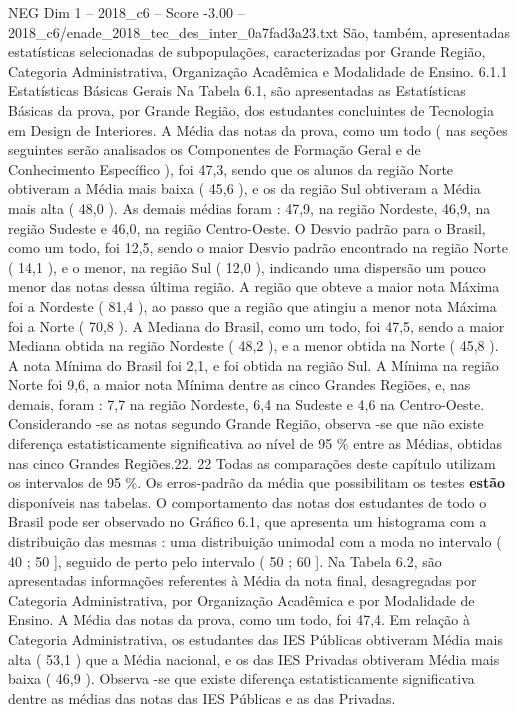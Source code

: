 \begin{textsample}{NEG Dim 1 – 2018\_c6 – Score -3.00 – 2018\_c6/enade\_2018\_tec\_des\_inter\_0a7fad3a23.txt}
São, também, apresentadas estatísticas selecionadas de subpopulações, caracterizadas por Grande Região, Categoria Administrativa, Organização Acadêmica e Modalidade de Ensino. 6.1.1 Estatísticas Básicas Gerais Na Tabela 6.1, são apresentadas as Estatísticas Básicas da prova, por Grande Região, dos estudantes concluintes de Tecnologia em Design de Interiores.
A Média das notas da prova, como um todo ( nas seções seguintes serão analisados os Componentes de Formação Geral e de Conhecimento Específico ), foi 47,3, sendo que os alunos da região Norte obtiveram a Média mais baixa ( 45,6 ), e os da região Sul obtiveram a Média mais alta ( 48,0 ).
As demais médias foram : 47,9, na região Nordeste, 46,9, na região Sudeste e 46,0, na região Centro-Oeste.
O Desvio padrão para o Brasil, como um todo, foi 12,5, sendo o maior Desvio padrão encontrado na região Norte ( 14,1 ), e o menor, na região Sul ( 12,0 ), indicando uma dispersão um pouco menor das notas dessa última região.
A região que obteve a maior nota Máxima foi a Nordeste ( 81,4 ), ao passo que a região que atingiu a menor nota Máxima foi a Norte ( 70,8 ).
A Mediana do Brasil, como um todo, foi 47,5, sendo a maior Mediana obtida na região Nordeste ( 48,2 ), e a menor obtida na Norte ( 45,8 ).
A nota Mínima do Brasil foi 2,1, e foi obtida na região Sul.
A Mínima na região Norte foi 9,6, a maior nota Mínima dentre as cinco Grandes Regiões, e, nas demais, foram : 7,7 na região Nordeste, 6,4 na Sudeste e 4,6 na Centro-Oeste.
Considerando -se as notas segundo Grande Região, observa -se que não existe diferença estatisticamente significativa ao nível de 95 \% entre as Médias, obtidas nas cinco Grandes Regiões.22. 22 Todas as comparações deste capítulo utilizam os intervalos de 95 \%.
Os erros-padrão da média que possibilitam os testes \textbf{estão} disponíveis nas tabelas.
O comportamento das notas dos estudantes de todo o Brasil pode ser observado no Gráfico 6.1, que apresenta um histograma com a distribuição das mesmas : uma distribuição unimodal com a moda no intervalo ( 40 ; 50 ], seguido de perto pelo intervalo ( 50 ; 60 ].
Na Tabela 6.2, são apresentadas informações referentes à Média da nota final, desagregadas por Categoria Administrativa, por Organização Acadêmica e por Modalidade de Ensino.
A Média das notas da prova, como um todo, foi 47,4.
Em relação à Categoria Administrativa, os estudantes das IES Públicas obtiveram Média mais alta ( 53,1 ) que a Média nacional, e os das IES Privadas obtiveram Média mais baixa ( 46,9 ).
Observa -se que existe diferença estatisticamente significativa dentre as médias das notas das IES Públicas e as das Privadas.

\end{textsample}
